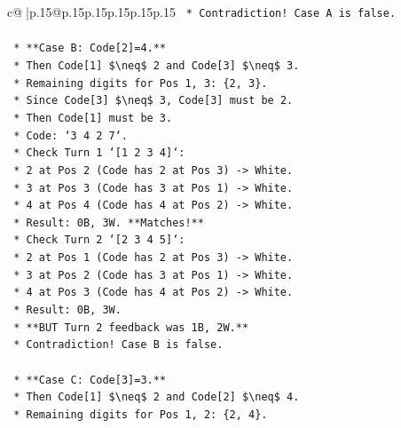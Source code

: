 \documentclass{article}
\begin{document}
{\begin{supertabular}{c@{$\;$}|p{.15\linewidth}@{}p{.15\linewidth}p{.15\linewidth}p{.15\linewidth}p{.15\linewidth}p{.15\linewidth}}
{{{\texttt{                    *   Contradiction! Case A is false.} \\
\\ 
\texttt{            *   **Case B: Code{[}2{]}=4.**} \\
\texttt{                *   Then Code{[}1{]} \$\textbackslash{}neq\$ 2 and Code{[}3{]} \$\textbackslash{}neq\$ 3.} \\
\texttt{                *   Remaining digits for Pos 1, 3: \{2, 3\}.} \\
\texttt{                *   Since Code{[}3{]} \$\textbackslash{}neq\$ 3, Code{[}3{]} must be 2.} \\
\texttt{                *   Then Code{[}1{]} must be 3.} \\
\texttt{                *   Code: `3 4 2 7`.} \\
\texttt{                *   Check Turn 1 `{[}1 2 3 4{]}`:} \\
\texttt{                    *   2 at Pos 2 (Code has 2 at Pos 3) {-}> White.} \\
\texttt{                    *   3 at Pos 3 (Code has 3 at Pos 1) {-}> White.} \\
\texttt{                    *   4 at Pos 4 (Code has 4 at Pos 2) {-}> White.} \\
\texttt{                    *   Result: 0B, 3W. **Matches!**} \\
\texttt{                *   Check Turn 2 `{[}2 3 4 5{]}`:} \\
\texttt{                    *   2 at Pos 1 (Code has 2 at Pos 3) {-}> White.} \\
\texttt{                    *   3 at Pos 2 (Code has 3 at Pos 1) {-}> White.} \\
\texttt{                    *   4 at Pos 3 (Code has 4 at Pos 2) {-}> White.} \\
\texttt{                    *   Result: 0B, 3W.} \\
\texttt{                    *   **BUT Turn 2 feedback was 1B, 2W.**} \\
\texttt{                    *   Contradiction! Case B is false.} \\
\\ 
\texttt{            *   **Case C: Code{[}3{]}=3.**} \\
\texttt{                *   Then Code{[}1{]} \$\textbackslash{}neq\$ 2 and Code{[}2{]} \$\textbackslash{}neq\$ 4.} \\
\texttt{                *   Remaining digits for Pos 1, 2: \{2, 4\}.} \\
}}}
\end{supertabular}}
\end{document}
